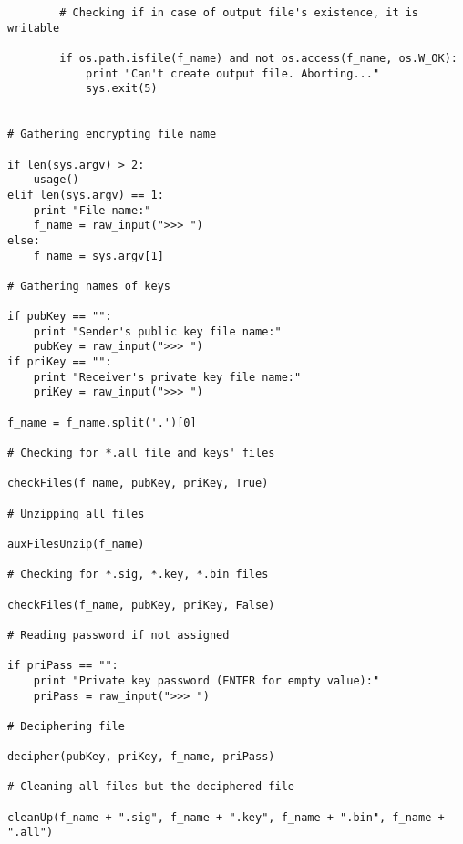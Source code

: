 \documentclass[a4paper,11pt,openright,oneside]{report}
\begin{document}
\begin{verbatim}
        # Checking if in case of output file's existence, it is writable

        if os.path.isfile(f_name) and not os.access(f_name, os.W_OK):
            print "Can't create output file. Aborting..."
            sys.exit(5)


# Gathering encrypting file name

if len(sys.argv) > 2:
    usage()
elif len(sys.argv) == 1:
    print "File name:"
    f_name = raw_input(">>> ")
else:
    f_name = sys.argv[1]

# Gathering names of keys

if pubKey == "":
    print "Sender's public key file name:"
    pubKey = raw_input(">>> ")
if priKey == "":
    print "Receiver's private key file name:"
    priKey = raw_input(">>> ")

f_name = f_name.split('.')[0]

# Checking for *.all file and keys' files

checkFiles(f_name, pubKey, priKey, True)

# Unzipping all files

auxFilesUnzip(f_name)

# Checking for *.sig, *.key, *.bin files

checkFiles(f_name, pubKey, priKey, False)

# Reading password if not assigned

if priPass == "":
    print "Private key password (ENTER for empty value):"
    priPass = raw_input(">>> ")

# Deciphering file

decipher(pubKey, priKey, f_name, priPass)

# Cleaning all files but the deciphered file

cleanUp(f_name + ".sig", f_name + ".key", f_name + ".bin", f_name + ".all")
\end{verbatim}

\maketitle
\nocite{*}
\printbibliography[title={Referências}]
\end{document}

